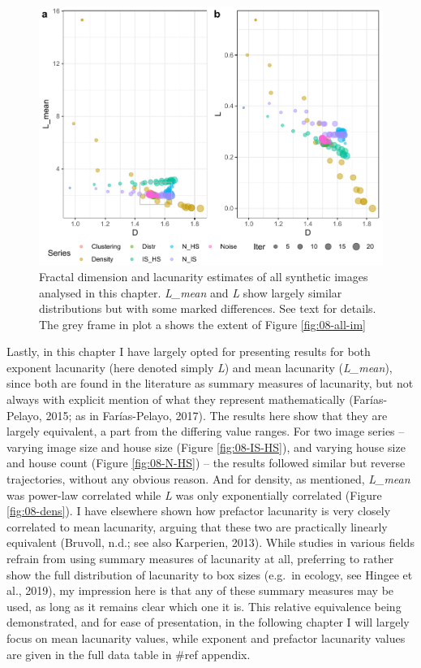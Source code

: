 \documentclass[
  12pt,
]{book}
\begin{document}
\begin{figure}

{\centering \includegraphics[width=0.9\linewidth]{bookdown-demo_files/figure-latex/08-all-1} 

}

\caption{Fractal dimension and lacunarity estimates of all synthetic images analysed in this chapter. \emph{L\_mean} and \emph{L} show largely similar distributions but with some marked differences. See text for details. The grey frame in plot a shows the extent of Figure \ref{fig:08-all-im}}\label{fig:08-all}
\end{figure}

Lastly, in this chapter I have largely opted for presenting results for both exponent lacunarity (here denoted simply \emph{L}) and mean lacunarity (\emph{L\_mean}), since both are found in the literature as summary measures of lacunarity, but not always with explicit mention of what they represent mathematically (Farías-Pelayo, 2015; as in Farías-Pelayo, 2017). The results here show that they are largely equivalent, a part from the differing value ranges. For two image series -- varying image size and house size (Figure \ref{fig:08-IS-HS}), and varying house size and house count (Figure \ref{fig:08-N-HS}) -- the results followed similar but reverse trajectories, without any obvious reason. And for density, as mentioned, \emph{L\_mean} was power-law correlated while \emph{L} was only exponentially correlated (Figure \ref{fig:08-dens}). I have elsewhere shown how prefactor lacunarity is very closely correlated to mean lacunarity, arguing that these two are practically linearly equivalent (Bruvoll, n.d.; see also Karperien, 2013). While studies in various fields refrain from using summary measures of lacunarity at all, preferring to rather show the full distribution of lacunarity to box sizes (e.g.~in ecology, see Hingee et al., 2019), my impression here is that any of these summary measures may be used, as long as it remains clear which one it is. This relative equivalence being demonstrated, and for ease of presentation, in the following chapter I will largely focus on mean lacunarity values, while exponent and prefactor lacunarity values are given in the full data table in \#ref appendix.
\end{document}
